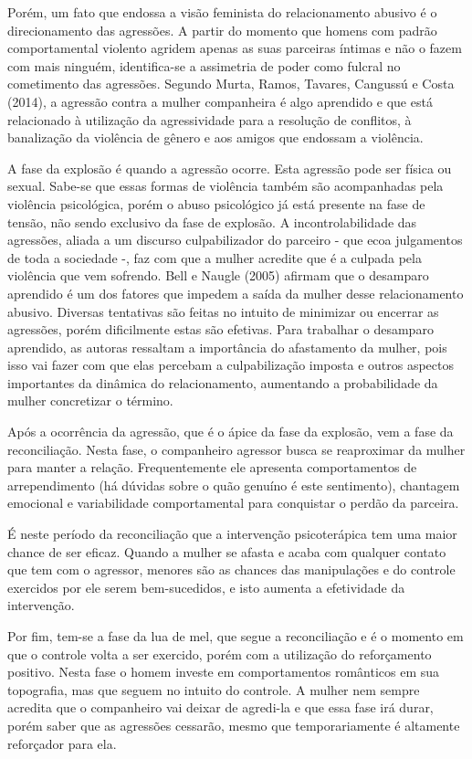 Porém, um fato que endossa a visão feminista do relacionamento abusivo é o direcionamento das agressões. A partir do momento que homens com padrão comportamental violento agridem apenas as suas parceiras íntimas e não o fazem com mais ninguém, identifica-se a assimetria de poder como fulcral no cometimento das agressões. Segundo Murta, Ramos, Tavares, Cangussú e Costa (2014), a agressão contra a mulher companheira é algo aprendido e que está relacionado à utilização da agressividade para a resolução de conflitos, à banalização da violência de gênero e aos amigos que endossam a violência.

A fase da explosão é quando a agressão ocorre. Esta agressão pode ser física ou sexual. Sabe-se que essas formas de violência também são acompanhadas pela violência psicológica, porém o abuso psicológico já está presente na fase de tensão, não sendo exclusivo da fase de explosão. A incontrolabilidade das agressões, aliada a um discurso culpabilizador do parceiro - que ecoa julgamentos de toda a sociedade -, faz com que a mulher acredite que é a culpada pela violência que vem sofrendo. Bell e Naugle (2005) afirmam que o desamparo aprendido é um dos fatores que impedem a saída da mulher desse relacionamento abusivo. Diversas tentativas são feitas no intuito de minimizar ou encerrar as agressões, porém dificilmente estas são efetivas. Para trabalhar o desamparo aprendido, as autoras ressaltam a importância do afastamento da mulher, pois isso vai fazer com que elas percebam a culpabilização imposta e outros aspectos importantes da dinâmica do relacionamento, aumentando a probabilidade da mulher concretizar o término.

Após a ocorrência da agressão, que é o ápice da fase da explosão, vem a fase da reconciliação. Nesta fase, o companheiro agressor busca se reaproximar da mulher para manter a relação. Frequentemente ele apresenta comportamentos de arrependimento (há dúvidas sobre o quão genuíno é este sentimento), chantagem emocional e variabilidade comportamental para conquistar o perdão da parceira.

É neste período da reconciliação que a intervenção psicoterápica tem uma maior chance de ser eficaz. Quando a mulher se afasta e acaba com qualquer contato que tem com o agressor, menores são as chances das manipulações e do controle exercidos por ele serem bem-sucedidos, e isto aumenta a efetividade da intervenção.

Por fim, tem-se a fase da lua de mel, que segue a reconciliação e é o momento em que o controle volta a ser exercido, porém com a utilização do reforçamento positivo. Nesta fase o homem investe em comportamentos românticos em sua topografia, mas que seguem no intuito do controle. A mulher nem sempre acredita que o companheiro vai deixar de agredi-la e que essa fase irá durar, porém saber que as agressões cessarão, mesmo que temporariamente é altamente reforçador para ela.

